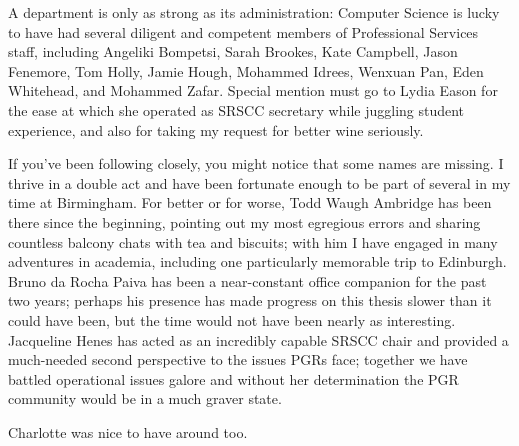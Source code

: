 A department is only as strong as its administration: Computer Science is lucky
to have had several diligent and competent members of Professional Services
staff, including Angeliki Bompetsi, Sarah Brookes, Kate Campbell, Jason
Fenemore, Tom Holly, Jamie Hough, Mohammed Idrees, Wenxuan Pan, Eden Whitehead,
and Mohammed Zafar.
Special mention must go to Lydia Eason for the ease at which she operated as
SRSCC secretary while juggling student experience, and also for taking my
request for better wine seriously.

If you've been following closely, you might notice that some names are missing.
I thrive in a double act and have been fortunate enough to be part of several
in my time at Birmingham.
For better or for worse, Todd Waugh Ambridge has been there since the beginning,
pointing out my most egregious errors and sharing countless balcony chats with
tea and biscuits; with him I have engaged in many adventures in academia,
including one particularly memorable trip to Edinburgh.
Bruno da Rocha Paiva has been a near-constant office companion for the past two
years; perhaps his presence has made progress on this thesis slower than it
could have been, but the time would not have been nearly as interesting.
Jacqueline Henes has acted as an incredibly capable SRSCC chair and provided a
much-needed second perspective to the issues PGRs face; together we have battled
operational issues galore and without her determination the PGR community would
be in a much graver state.

Charlotte was nice to have around too.
